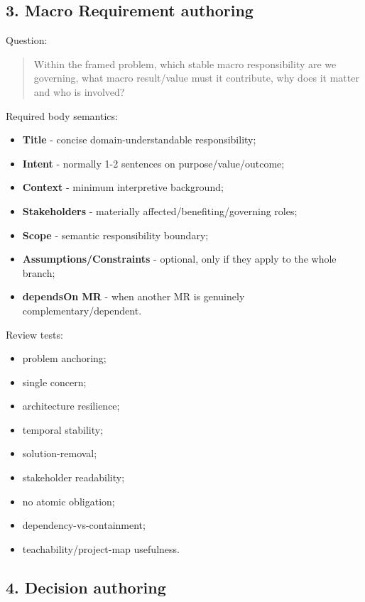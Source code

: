 \documentclass[
  10pt,
]{article}
\providecommand{\tightlist}{%
  \setlength{\itemsep}{0pt}\setlength{\parskip}{0pt}}
\begin{document}
\subsection{3. Macro Requirement
authoring}\label{3-macro-requirement-authoring}

Question:

\begin{quote}
Within the framed problem, which stable macro responsibility are we
governing, what macro result/value must it contribute, why does it
matter and who is involved?
\end{quote}

Required body semantics:

\begin{itemize}
\tightlist
\item
  \textbf{Title} - concise domain-understandable responsibility;
\item
  \textbf{Intent} - normally 1-2 sentences on purpose/value/outcome;
\item
  \textbf{Context} - minimum interpretive background;
\item
  \textbf{Stakeholders} - materially affected/benefiting/governing
  roles;
\item
  \textbf{Scope} - semantic responsibility boundary;
\item
  \textbf{Assumptions/Constraints} - optional, only if they apply to the
  whole branch;
\item
  \textbf{dependsOn MR} - when another MR is genuinely
  complementary/dependent.
\end{itemize}

Review tests:

\begin{itemize}
\tightlist
\item
  problem anchoring;
\item
  single concern;
\item
  architecture resilience;
\item
  temporal stability;
\item
  solution-removal;
\item
  stakeholder readability;
\item
  no atomic obligation;
\item
  dependency-vs-containment;
\item
  teachability/project-map usefulness.
\end{itemize}

\subsection{4. Decision authoring}\label{4-decision-authoring}
\end{document}
